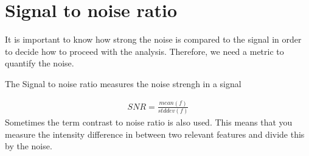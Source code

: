 \documentclass[letterpaper,10pt,english]{sphinxmanual}
\begin{document}
\begin{sphinxVerbatim}[commandchars=\\\{\}]
   
\end{sphinxVerbatim}

\noindent{}


\section{Signal to noise ratio}
\label{\detokenize{02-ImageEnhancement:signal-to-noise-ratio}}
\sphinxAtStartPar
It is important to know how strong the noise is compared to the signal in order to decide how to proceed with the analysis. Therefore, we need a metric to quantify the noise.

\sphinxAtStartPar
The Signal to noise ratio measures the noise strengh in a signal

\sphinxAtStartPar
{}
\begin{equation*}
\begin{split}SNR=\frac{mean(f)}{stddev(f)}\end{split}
\end{equation*}
\sphinxAtStartPar
Sometimes the term contrast to noise ratio is also used. This means that you measure the intensity difference in between two relevant features and divide this by the noise.
\end{document}
